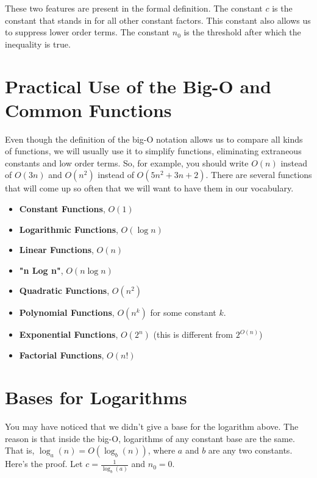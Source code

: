 These two features are present in the formal definition.
The constant $c$ is the constant that stands in for all other constant factors.
This constant also allows us to suppress lower order terms.
The constant $n_0$ is the threshold after which the inequality is true.

\section{Practical Use of the Big-O and Common Functions}


Even though the definition of the big-O notation allows us to compare all kinds of functions, we will usually use it to simplify functions, eliminating extraneous constants and low order terms.
So, for example, you should write $O(n)$ instead of $O(3n)$ and $O(n^2)$ instead of $O(5n^2 + 3n + 2)$.
There are several functions that will come up so often that we will want to have them in our vocabulary.

\begin{itemize}

\item \textbf{Constant Functions}, $O(1)$

\item \textbf{Logarithmic Functions}, $O(\log n)$

\item \textbf{Linear Functions}, $O(n)$

\item \textbf{"n Log n"}, $O(n\log n)$

\item \textbf{Quadratic Functions}, $O(n^2)$

\item \textbf{Polynomial Functions}, $O(n^k)$ for some constant $k$.

\item \textbf{Exponential Functions}, $O(2^n)$ (this is different from $2^{O(n)}$)

\item \textbf{Factorial Functions}, $O(n!)$

\end{itemize}
\section{Bases for Logarithms}


You may have noticed that we didn't give a base for the logarithm above.
The reason is that inside the big-O, logarithms of any constant base are the same.
That is, $\log_a(n) = O(\log_b(n))$, where $a$ and $b$ are any two constants.
Here's the proof.
Let $c = \frac{1}{\log_b(a)}$ and $n_0 = 0$.  


